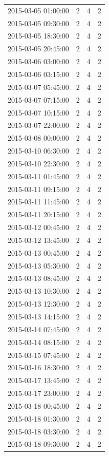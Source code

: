 \begin{tabular}{lrrr}
2015-03-05 01:00:00 & 2 & 4 & 2 \\
2015-03-05 09:30:00 & 2 & 4 & 2 \\
2015-03-05 18:30:00 & 2 & 4 & 2 \\
2015-03-05 20:45:00 & 2 & 4 & 2 \\
2015-03-06 03:00:00 & 2 & 4 & 2 \\
2015-03-06 03:15:00 & 2 & 4 & 2 \\
2015-03-07 05:45:00 & 2 & 4 & 2 \\
2015-03-07 07:15:00 & 2 & 4 & 2 \\
2015-03-07 10:15:00 & 2 & 4 & 2 \\
2015-03-07 22:00:00 & 2 & 4 & 2 \\
2015-03-08 00:00:00 & 2 & 4 & 2 \\
2015-03-10 06:30:00 & 2 & 4 & 2 \\
2015-03-10 22:30:00 & 2 & 4 & 2 \\
2015-03-11 01:45:00 & 2 & 4 & 2 \\
2015-03-11 09:15:00 & 2 & 4 & 2 \\
2015-03-11 11:45:00 & 2 & 4 & 2 \\
2015-03-11 20:15:00 & 2 & 4 & 2 \\
2015-03-12 00:45:00 & 2 & 4 & 2 \\
2015-03-12 13:45:00 & 2 & 4 & 2 \\
2015-03-13 00:45:00 & 2 & 4 & 2 \\
2015-03-13 05:30:00 & 2 & 4 & 2 \\
2015-03-13 08:45:00 & 2 & 4 & 2 \\
2015-03-13 10:30:00 & 2 & 4 & 2 \\
2015-03-13 12:30:00 & 2 & 4 & 2 \\
2015-03-13 14:15:00 & 2 & 4 & 2 \\
2015-03-14 07:45:00 & 2 & 4 & 2 \\
2015-03-14 08:15:00 & 2 & 4 & 2 \\
2015-03-15 07:45:00 & 2 & 4 & 2 \\
2015-03-16 18:30:00 & 2 & 4 & 2 \\
2015-03-17 13:45:00 & 2 & 4 & 2 \\
2015-03-17 23:00:00 & 2 & 4 & 2 \\
2015-03-18 00:45:00 & 2 & 4 & 2 \\
2015-03-18 01:30:00 & 2 & 4 & 2 \\
2015-03-18 03:30:00 & 2 & 4 & 2 \\
2015-03-18 09:30:00 & 2 & 4 & 2 \\

\end{tabular}
